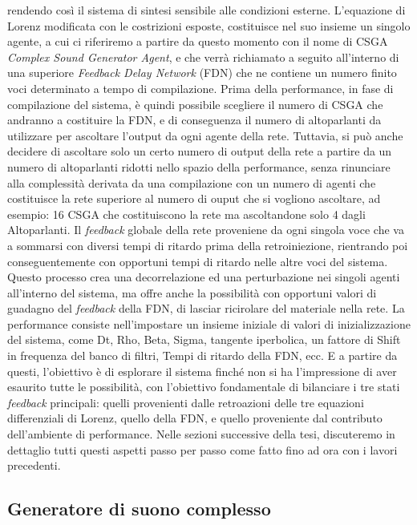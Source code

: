 rendendo così il sistema di sintesi sensibile alle condizioni esterne.
L'equazione di Lorenz modificata con le costrizioni esposte,
costituisce nel suo insieme un singolo agente, a cui ci riferiremo a partire da questo
momento con il nome di CSGA \textit{Complex Sound Generator Agent}, e che verrà richiamato a seguito
all'interno di una superiore \textit{Feedback Delay Network} (FDN) che ne contiene un 
numero finito voci determinato a tempo di compilazione. 
Prima della performance, in fase di compilazione del sistema,
è quindi possibile scegliere il numero di CSGA che andranno a costituire 
la FDN, e di conseguenza il numero di altoparlanti da utilizzare
per ascoltare l'output da ogni agente della rete.
Tuttavia, si può anche decidere di ascoltare solo un certo numero di output
della rete a partire da un numero di altoparlanti ridotti nello spazio della performance,
senza rinunciare alla complessità derivata da una compilazione con un
numero di agenti che costituisce la rete superiore al numero di ouput che si vogliono ascoltare, 
ad esempio: 16 CSGA che costituiscono la rete ma ascoltandone solo 4 dagli Altoparlanti.
Il \emph{feedback} globale della rete proveniene da ogni singola voce 
che va a sommarsi con diversi tempi di ritardo prima della retroiniezione,
rientrando poi conseguentemente con opportuni tempi di ritardo nelle altre voci del sistema.
Questo processo crea una decorrelazione ed una perturbazione nei singoli agenti all'interno del sistema,
ma offre anche la possibilità con opportuni valori di guadagno del \emph{feedback} della FDN, 
di lasciar ricirolare del materiale nella rete.
La performance consiste nell'impostare un insieme iniziale di valori 
di inizializzazione del sistema, come Dt, Rho, Beta, Sigma, 
tangente iperbolica, 
un fattore di Shift in frequenza del banco di filtri, 
Tempi di ritardo della FDN, ecc.
E a partire da questi, l'obiettivo è di esplorare il sistema 
finché non si ha l'impressione di aver esaurito tutte le possibilità, 
con l'obiettivo fondamentale di bilanciare i tre stati \emph{feedback} principali: 
quelli provenienti dalle retroazioni delle tre equazioni differenziali 
di Lorenz, quello della FDN, e quello proveniente dal contributo 
dell'ambiente di performance.
Nelle sezioni successive della tesi, 
discuteremo in dettaglio tutti questi aspetti passo per passo
come fatto fino ad ora con i lavori precedenti. 

\subsection{Generatore di suono complesso}
\label{Complex Sound Generators}

